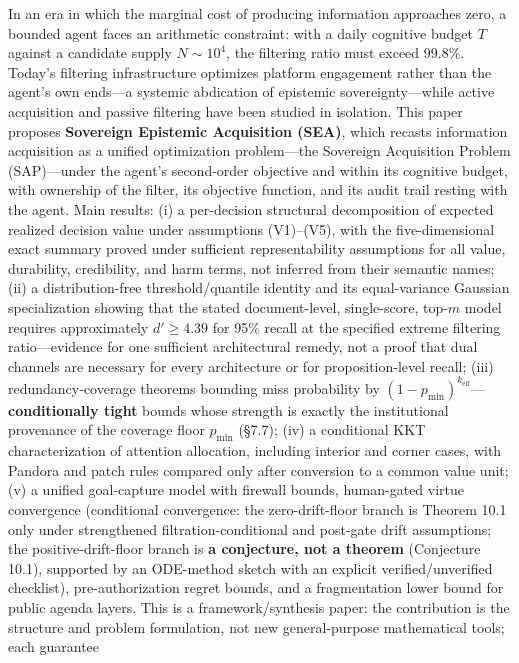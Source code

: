 \documentclass[
  11pt]{article}
\begin{document}
In an era in which the marginal cost of producing information approaches
zero, a bounded agent faces an arithmetic constraint: with a daily
cognitive budget \(T\) against a candidate supply \(N \sim 10^4\), the
filtering ratio must exceed 99.8\%. Today's filtering infrastructure
optimizes platform engagement rather than the agent's own ends---a
systemic abdication of epistemic sovereignty---while active acquisition
and passive filtering have been studied in isolation. This paper
proposes \textbf{Sovereign Epistemic Acquisition (SEA)}, which recasts
information acquisition as a unified optimization problem---the
Sovereign Acquisition Problem (SAP)---under the agent's second-order
objective and within its cognitive budget, with ownership of the filter,
its objective function, and its audit trail resting with the agent. Main
results: (i) a per-decision structural decomposition of expected
realized decision value under assumptions (V1)--(V5), with the
five-dimensional exact summary proved under sufficient representability
assumptions for all value, durability, credibility, and harm terms, not
inferred from their semantic names; (ii) a distribution-free
threshold/quantile identity and its equal-variance Gaussian
specialization showing that the stated document-level, single-score,
top-\(m\) model requires approximately \(d' \ge 4.39\) for 95\% recall
at the specified extreme filtering ratio---evidence for one sufficient
architectural remedy, not a proof that dual channels are necessary for
every architecture or for proposition-level recall; (iii)
redundancy-coverage theorems bounding miss probability by
\((1-p_{\min})^{k_{\mathrm{eff}}}\)---\textbf{conditionally tight}
bounds whose strength is exactly the institutional provenance of the
coverage floor \(p_{\min}\) (§7.7); (iv) a conditional KKT
characterization of attention allocation, including interior and corner
cases, with Pandora and patch rules compared only after conversion to a
common value unit; (v) a unified goal-capture model with firewall
bounds, human-gated virtue convergence (conditional convergence: the
zero-drift-floor branch is Theorem 10.1 only under strengthened
filtration-conditional and post-gate drift assumptions; the
positive-drift-floor branch is \textbf{a conjecture, not a theorem}
(Conjecture 10.1), supported by an ODE-method sketch with an explicit
verified/unverified checklist), pre-authorization regret bounds, and a
fragmentation lower bound for public agenda layers. This is a
framework/synthesis paper: the contribution is the structure and problem
formulation, not new general-purpose mathematical tools; each guarantee
\end{document}

